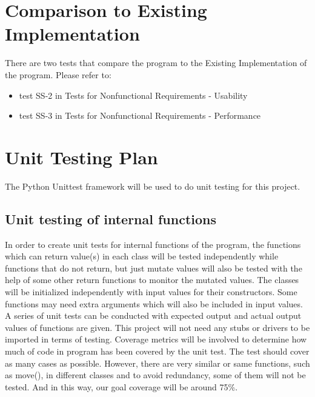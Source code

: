 \documentclass[12pt, titlepage]{article}
\begin{document}
	
\section{Comparison to Existing Implementation}	
There are two tests that compare the program to the Existing Implementation of the program. Please refer to:
\begin{itemize}
	\item test SS-2 in Tests for Nonfunctional Requirements - Usability
	\item test SS-3 in Tests for Nonfunctional Requirements - Performance
\end{itemize}

				
\section{Unit Testing Plan}
The Python Unittest framework will be used to do unit testing for this project.
		
\subsection{Unit testing of internal functions}
In order to create unit tests for internal functions of the program, the functions which can return value(s) in each class will be tested independently while functions that do not return, but just mutate values will also be tested with the help of some other return functions to monitor the mutated values. The classes will be initialized independently with input values for their constructors. Some functions may need extra arguments which will also be included in input values. A series of unit tests can be conducted with expected output and actual output values of functions are given. This project will not need any stubs or drivers to be imported in terms of testing. Coverage metrics will be involved to determine how much of code in program has been covered by the unit test. The test should cover as many cases as possible. However, there are very similar or same functions, such as move(), in different classes and to avoid redundancy, some of them will not be tested. And in this way, our goal coverage will be around 75\%.
\end{document}
